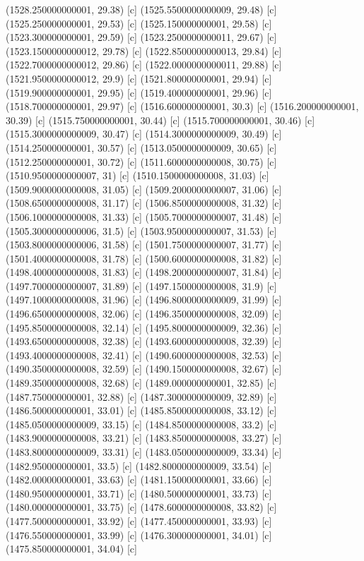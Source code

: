 {{{(1528.250000000001, 29.38) [c] 
(1525.5500000000009, 29.48) [c] 
(1525.250000000001, 29.53) [c] 
(1525.150000000001, 29.58) [c] 
(1523.300000000001, 29.59) [c] 
(1523.2500000000011, 29.67) [c] 
(1523.1500000000012, 29.78) [c] 
(1522.8500000000013, 29.84) [c] 
(1522.7000000000012, 29.86) [c] 
(1522.0000000000011, 29.88) [c] 
(1521.9500000000012, 29.9) [c] 
(1521.800000000001, 29.94) [c] 
(1519.900000000001, 29.95) [c] 
(1519.400000000001, 29.96) [c] 
(1518.700000000001, 29.97) [c] 
(1516.600000000001, 30.3) [c] 
(1516.200000000001, 30.39) [c] 
(1515.750000000001, 30.44) [c] 
(1515.700000000001, 30.46) [c] 
(1515.3000000000009, 30.47) [c] 
(1514.3000000000009, 30.49) [c] 
(1514.250000000001, 30.57) [c] 
(1513.0500000000009, 30.65) [c] 
(1512.250000000001, 30.72) [c] 
(1511.6000000000008, 30.75) [c] 
(1510.9500000000007, 31) [c] 
(1510.1500000000008, 31.03) [c] 
(1509.9000000000008, 31.05) [c] 
(1509.2000000000007, 31.06) [c] 
(1508.6500000000008, 31.17) [c] 
(1506.8500000000008, 31.32) [c] 
(1506.1000000000008, 31.33) [c] 
(1505.7000000000007, 31.48) [c] 
(1505.3000000000006, 31.5) [c] 
(1503.9500000000007, 31.53) [c] 
(1503.8000000000006, 31.58) [c] 
(1501.7500000000007, 31.77) [c] 
(1501.4000000000008, 31.78) [c] 
(1500.6000000000008, 31.82) [c] 
(1498.4000000000008, 31.83) [c] 
(1498.2000000000007, 31.84) [c] 
(1497.7000000000007, 31.89) [c] 
(1497.1500000000008, 31.9) [c] 
(1497.1000000000008, 31.96) [c] 
(1496.8000000000009, 31.99) [c] 
(1496.6500000000008, 32.06) [c] 
(1496.3500000000008, 32.09) [c] 
(1495.8500000000008, 32.14) [c] 
(1495.8000000000009, 32.36) [c] 
(1493.6500000000008, 32.38) [c] 
(1493.6000000000008, 32.39) [c] 
(1493.4000000000008, 32.41) [c] 
(1490.6000000000008, 32.53) [c] 
(1490.3500000000008, 32.59) [c] 
(1490.1500000000008, 32.67) [c] 
(1489.3500000000008, 32.68) [c] 
(1489.000000000001, 32.85) [c] 
(1487.750000000001, 32.88) [c] 
(1487.3000000000009, 32.89) [c] 
(1486.500000000001, 33.01) [c] 
(1485.8500000000008, 33.12) [c] 
(1485.0500000000009, 33.15) [c] 
(1484.8500000000008, 33.2) [c] 
(1483.9000000000008, 33.21) [c] 
(1483.8500000000008, 33.27) [c] 
(1483.8000000000009, 33.31) [c] 
(1483.0500000000009, 33.34) [c] 
(1482.950000000001, 33.5) [c] 
(1482.8000000000009, 33.54) [c] 
(1482.000000000001, 33.63) [c] 
(1481.150000000001, 33.66) [c] 
(1480.950000000001, 33.71) [c] 
(1480.500000000001, 33.73) [c] 
(1480.000000000001, 33.75) [c] 
(1478.6000000000008, 33.82) [c] 
(1477.500000000001, 33.92) [c] 
(1477.450000000001, 33.93) [c] 
(1476.550000000001, 33.99) [c] 
(1476.300000000001, 34.01) [c] 
(1475.850000000001, 34.04) [c] 
}}}
